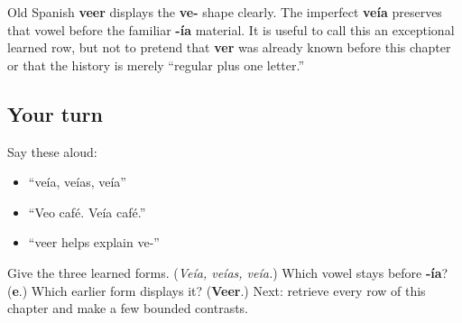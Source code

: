 \begin{cousinweb}
Old Spanish \textbf{veer} displays the \textbf{ve-} shape clearly. The imperfect \textbf{veía} preserves that vowel before the familiar \textbf{-ía} material. It is useful to call this an exceptional learned row, but not to pretend that \textbf{ver} was already known before this chapter or that the history is merely “regular plus one letter.”
\end{cousinweb}

\subsection*{Your turn}
Say these aloud:

\begin{itemize}
\raggedright
  \item “veía, veías, veía”
  \item “Veo café. Veía café.”
  \item “veer helps explain ve-”
\end{itemize}

\begin{tcolorbox}[breakable,colback=teal!4,colframe=teal!35!black,title={Before you move on}]
Give the three learned forms. (\emph{Veía, veías, veía.}) Which vowel stays before \textbf{-ía}? (\textbf{e}.) Which earlier form displays it? (\textbf{Veer}.) Next: retrieve every row of this chapter and make a few bounded contrasts.
\end{tcolorbox}
